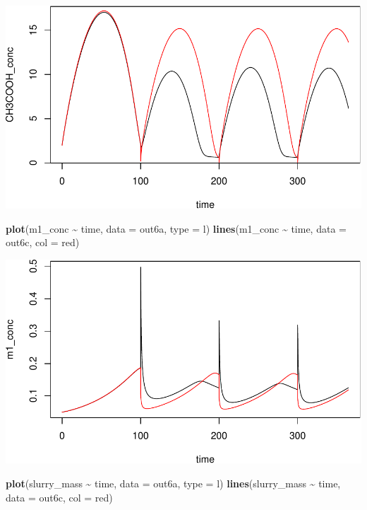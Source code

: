 \documentclass[
]{article}
\newenvironment{Shaded}{\begin{snugshade}}{\end{snugshade}}
\newcommand{\AttributeTok}[1]{\textcolor[rgb]{0.13,0.29,0.53}{#1}}
\newcommand{\FunctionTok}[1]{\textcolor[rgb]{0.13,0.29,0.53}{\textbf{#1}}}
\newcommand{\NormalTok}[1]{#1}
\newcommand{\SpecialCharTok}[1]{\textcolor[rgb]{0.81,0.36,0.00}{\textbf{#1}}}
\newcommand{\StringTok}[1]{\textcolor[rgb]{0.31,0.60,0.02}{#1}}
\begin{document}
\includegraphics{simple_demo_files/figure-latex/unnamed-chunk-50-1.pdf}

\begin{Shaded}
\begin{Highlighting}[]
\FunctionTok{plot}\NormalTok{(m1\_conc }\SpecialCharTok{\textasciitilde{}}\NormalTok{ time, }\AttributeTok{data =}\NormalTok{ out6a, }\AttributeTok{type =} \StringTok{\textquotesingle{}l\textquotesingle{}}\NormalTok{)}
\FunctionTok{lines}\NormalTok{(m1\_conc }\SpecialCharTok{\textasciitilde{}}\NormalTok{ time, }\AttributeTok{data =}\NormalTok{ out6c, }\AttributeTok{col =} \StringTok{\textquotesingle{}red\textquotesingle{}}\NormalTok{)}
\end{Highlighting}
\end{Shaded}

\includegraphics{simple_demo_files/figure-latex/unnamed-chunk-51-1.pdf}

\begin{Shaded}
\begin{Highlighting}[]
\FunctionTok{plot}\NormalTok{(slurry\_mass }\SpecialCharTok{\textasciitilde{}}\NormalTok{ time, }\AttributeTok{data =}\NormalTok{ out6a, }\AttributeTok{type =} \StringTok{\textquotesingle{}l\textquotesingle{}}\NormalTok{)}
\FunctionTok{lines}\NormalTok{(slurry\_mass }\SpecialCharTok{\textasciitilde{}}\NormalTok{ time, }\AttributeTok{data =}\NormalTok{ out6c, }\AttributeTok{col =} \StringTok{\textquotesingle{}red\textquotesingle{}}\NormalTok{)}
\end{Highlighting}
\end{Shaded}
\end{document}
